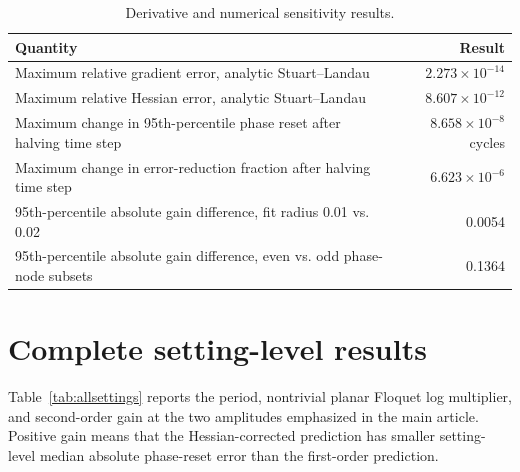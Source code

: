\documentclass[11pt]{article}
\begin{document}
\begin{table}[ht]
\centering
\caption{Derivative and numerical sensitivity results.}
\label{tab:sensitivity}
\begin{tabular}{p{}r}
\toprule
Quantity & Result\\
\midrule
Maximum relative gradient error, analytic Stuart--Landau & $2.273\times10^{-14}$\\
Maximum relative Hessian error, analytic Stuart--Landau & $8.607\times10^{-12}$\\
Maximum change in 95th-percentile phase reset after halving time step & $8.658\times10^{-8}$ cycles\\
Maximum change in error-reduction fraction after halving time step & $6.623\times10^{-6}$\\
95th-percentile absolute gain difference, fit radius 0.01 vs. 0.02 & 0.0054\\
95th-percentile absolute gain difference, even vs. odd phase-node subsets & 0.1364\\
\bottomrule
\end{tabular}
\end{table}

\section{Complete setting-level results}
Table~\ref{tab:allsettings} reports the period, nontrivial planar Floquet log multiplier, and second-order gain at the two amplitudes emphasized in the main article. Positive gain means that the Hessian-corrected prediction has smaller setting-level median absolute phase-reset error than the first-order prediction.



\printbibliography
\end{document}
